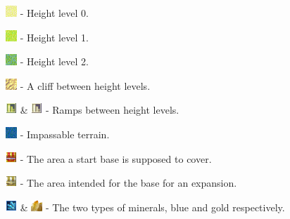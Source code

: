 \begin{my_itemize}

	\item \includegraphics[scale=0.7]{Images/Tiles/Height0} - Height level 0.

	\item \includegraphics[scale=0.7]{Images/Tiles/Height1} - Height level 1.

	\item \includegraphics[scale=0.7]{Images/Tiles/Height2} - Height level 2.

	\item \includegraphics[scale=0.7]{Images/Tiles/Cliff} - A cliff between height levels.

	\item \includegraphics[scale=0.7]{Images/Tiles/Ramp01} \& \includegraphics[scale=0.7]{Images/Tiles/Ramp12} - Ramps between height levels.

	\item \includegraphics[scale=0.7]{Images/Tiles/Impassable} - Impassable terrain.

	\item \includegraphics[scale=0.7]{Images/Tiles/StartBase} - The area a start base is supposed to cover.

	\item \includegraphics[scale=0.7]{Images/Tiles/Base} - The area intended for the base for an expansion.

	\item \includegraphics[scale=0.7]{Images/Tiles/BlueMinerals} \& \includegraphics[scale=0.7]{Images/Tiles/GoldMinerals} - The two types of minerals, blue and gold respectively.


\end{my_itemize}
